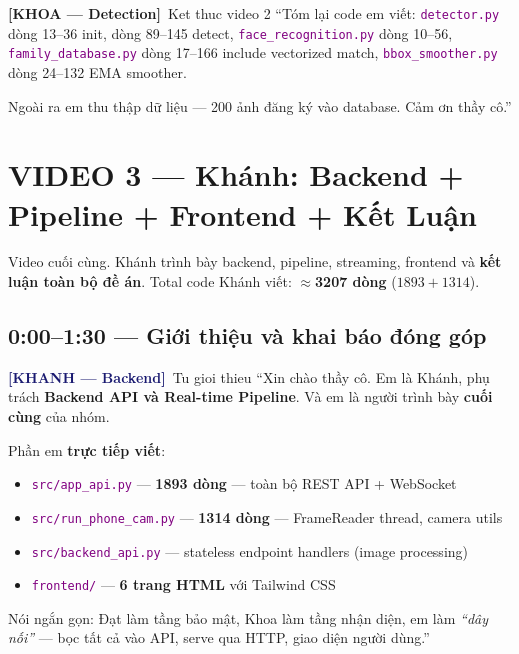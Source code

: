 \documentclass[12pt, a4paper]{article}
\newcommand{\khanh}{\textcolor{MidnightBlue}{\textbf{[KHANH --- Backend]}}}
\newcommand{\khoa}{\textcolor{OliveGreen}{\textbf{[KHOA --- Detection]}}}
\newcommand{\fpath}[1]{\texttt{\textcolor{purple}{#1}}}
\begin{document}
\begin{dialog}{\khoa\ Ket thuc video 2}
``Tóm lại code em viết:
\fpath{detector.py} dòng 13--36 init, dòng 89--145 detect,
\fpath{face\_recognition.py} dòng 10--56,
\fpath{family\_database.py} dòng 17--166 include vectorized match,
\fpath{bbox\_smoother.py} dòng 24--132 EMA smoother.

Ngoài ra em thu thập dữ liệu --- 200 ảnh đăng ký vào database.
Cảm ơn thầy cô.''
\end{dialog}

\newpage

\section{VIDEO 3 --- Khánh: Backend + Pipeline + Frontend + Kết Luận}

\begin{tcolorbox}[colback=MidnightBlue!8, colframe=MidnightBlue,
  title={\textcolor{white}{\textbf{VIDEO 3 --- KHANH (CUOI) --- FastAPI + Pipeline + Frontend + KET LUAN}}}]
Video cuối cùng. Khánh trình bày backend, pipeline, streaming, frontend
và \textbf{kết luận toàn bộ đề án}.
Total code Khánh viết: $\approx$\textbf{3207 dòng} ($1893 + 1314$).
\end{tcolorbox}

\subsection{0:00--1:30 --- Giới thiệu và khai báo đóng góp}

\begin{dialog}{\khanh\ Tu gioi thieu}
``Xin chào thầy cô. Em là Khánh, phụ trách \textbf{Backend API và Real-time Pipeline}.
Và em là người trình bày \textbf{cuối cùng} của nhóm.

Phần em \textbf{trực tiếp viết}:
\begin{itemize}
  \item \fpath{src/app\_api.py} --- \textbf{1893 dòng} --- toàn bộ REST API + WebSocket
  \item \fpath{src/run\_phone\_cam.py} --- \textbf{1314 dòng} --- FrameReader thread, camera utils
  \item \fpath{src/backend\_api.py} --- stateless endpoint handlers (image processing)
  \item \fpath{frontend/} --- \textbf{6 trang HTML} với Tailwind CSS
\end{itemize}
Nói ngắn gọn: Đạt làm tầng bảo mật, Khoa làm tầng nhận diện,
em làm \textit{``dây nối''} --- bọc tất cả vào API, serve qua HTTP, giao diện người dùng.''
\end{dialog}
\end{document}

